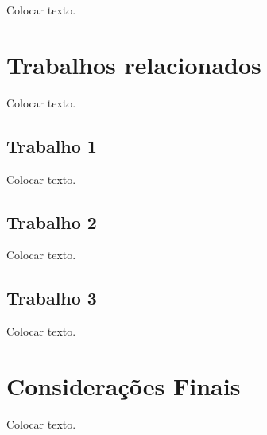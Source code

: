 \documentclass[12pt,article,compsoc]{IEEEtran}
\begin{document}
Colocar texto.


\section{Trabalhos relacionados}\label{sec:relacionados}

Colocar texto.


\subsection{Trabalho 1}

Colocar texto.


\subsection{Trabalho 2}

Colocar texto.


\subsection{Trabalho 3}

Colocar texto.


\section{Considerações Finais}\label{sec:consideracoesFinais}

Colocar texto.





\end{document}
